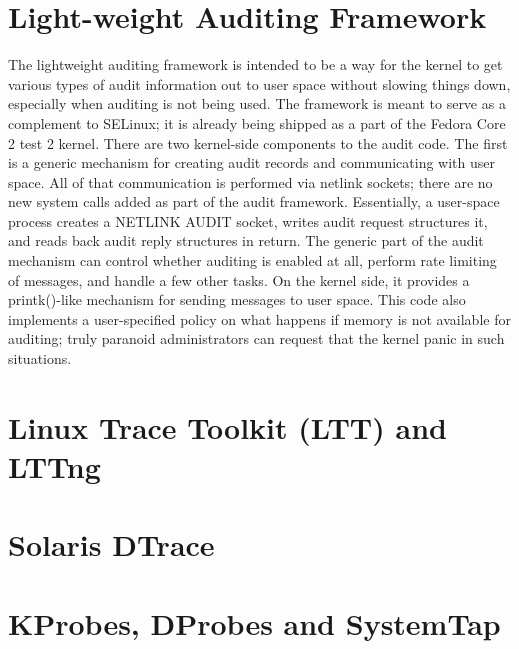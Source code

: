\section{Light-weight Auditing Framework}

The lightweight auditing framework is intended to be a way for the kernel to
get various types of audit information out to user space without slowing things
down, especially when auditing is not being used. The framework is meant to
serve as a complement to SELinux; it is already being shipped as a part of the
Fedora Core 2 test 2 kernel. There are two kernel-side components to the audit
code. The first is a generic mechanism for creating audit records and
communicating with user space. All of that communication is performed via
netlink sockets; there are no new system calls added as part of the audit
framework. Essentially, a user-space process creates a NETLINK AUDIT socket,
writes audit request structures it, and reads back audit reply structures in
return. The generic part of the audit mechanism can control whether auditing is
enabled at all, perform rate limiting of messages, and handle a few other
tasks. On the kernel side, it provides a printk()-like mechanism for sending
messages to user space. This code also implements a user-specified policy on
what happens if memory is not available for auditing; truly paranoid
administrators can request that the kernel panic in such situations.

\section{Linux Trace Toolkit (LTT) and LTTng}

\section{Solaris DTrace}

\section{KProbes, DProbes and SystemTap}
